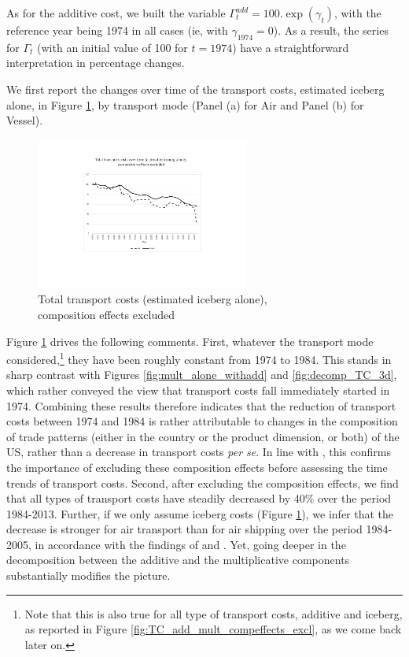 \documentclass[a4paper,11pt]{article}
\begin{document}
As for the additive cost, we built the variable $\Gamma^{add}_t = 100.\exp(\gamma_t)$, with the reference year being 1974 in all cases (ie, with $\gamma_{1974}=0$). As a result, the series for $\Gamma_t$ (with an initial value of 100 for $t=1974$) have a straightforward interpretation in percentage changes. \medskip

We first report the changes over time of the transport costs, estimated iceberg alone, in Figure \ref{fig:totalTC_compeffects_excl}, by transport mode (Panel (a) for Air and Panel (b) for Vessel).

\begin{figure}[htbp]
\caption{Total transport costs (estimated iceberg alone), \\
composition effects excluded
}
\label{fig:totalTC_compeffects_excl}
\begin{center}
\includegraphics[width=7cm, height=5cm]{Fig3a_TC_overtime_comp_effects_excl.pdf}
\end{center}
\end{figure}


Figure \ref{fig:totalTC_compeffects_excl} drives the following comments. First, whatever the transport mode considered,\footnote{Note that this is also true for all type of transport costs, additive and iceberg, as reported in Figure \ref{fig:TC_add_mult_compeffects_excl}, as we come back later on.} they have been roughly constant from 1974 to 1984. This stands in sharp contrast with Figures \ref{fig:mult_alone_withadd} and \ref{fig:decomp_TC_3d}, which rather conveyed the view that transport costs fall immediately started in 1974. Combining these results therefore indicates that the reduction of transport costs between 1974 and 1984 is rather attributable to changes in the composition of trade patterns (either in the country or the product dimension, or both) of the US, rather than a decrease in transport costs \textit{per se}. In line with \citet{hummels2007}, this confirms the importance of excluding these composition effects before assessing the time trends of transport costs. Second, after excluding the composition effects, we find that all types of transport costs have steadily decreased by 40\% over the period 1984-2013. Further, if we only assume iceberg costs (Figure \ref{fig:totalTC_compeffects_excl}), we infer that the decrease is stronger for air transport than for air shipping over the period 1984-2005, in accordance with the findings of \cite{hummels2007} and \cite{Behar_Venables}. Yet, going deeper in the decomposition between the additive and the multiplicative components substantially modifies the picture.
\end{document}
